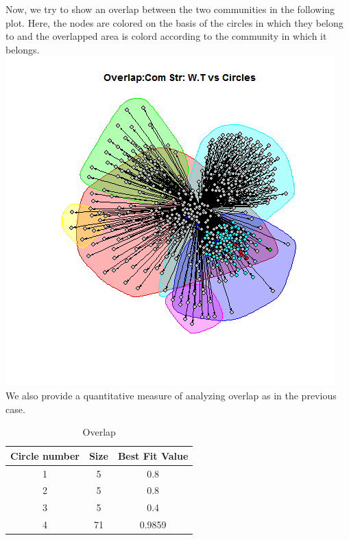 \documentclass{article}
\begin{document}
\begin{enumerate}
 Now, we try to show an overlap between the two communities in the following plot.
Here, the nodes are colored on the basis of the circles in which they belong to and 
the overlapped area is colord according to the community in which it belongs.\\
 \includegraphics[scale=0.7]{7_2h} \\
 
 We also provide a quantitative measure of analyzing overlap as in the previous case.
\begin{table}[ht]
\caption{Overlap}
\centering
\begin{tabular}{|c |c |c |}
\hline\hline
\newline

Circle number & Size & Best Fit Value \\ [0.5ex]
\hline
1 & 5 & 0.8 \\
\hline
2 & 5 & 0.8 \\
\hline
3 & 5 & 0.4 \\
\hline
4 & 71 & 0.9859 \\
\hline

\end{tabular}
\end{table} 
\end{enumerate}
\end{document}
